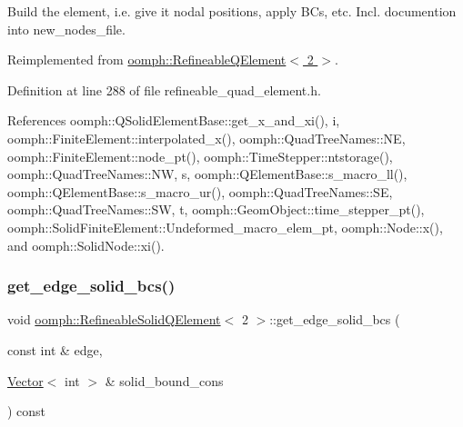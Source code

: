 Build the element, i.\+e. give it nodal positions, apply B\+Cs, etc. Incl. documention into new\+\_\+nodes\+\_\+file. 



Reimplemented from \hyperlink{classoomph_1_1RefineableQElement_3_012_01_4_a8be1a217931d1054ab626ebd1adae182}{oomph\+::\+Refineable\+Q\+Element$<$ 2 $>$}.



Definition at line 288 of file refineable\+\_\+quad\+\_\+element.\+h.



References oomph\+::\+Q\+Solid\+Element\+Base\+::get\+\_\+x\+\_\+and\+\_\+xi(), i, oomph\+::\+Finite\+Element\+::interpolated\+\_\+x(), oomph\+::\+Quad\+Tree\+Names\+::\+NE, oomph\+::\+Finite\+Element\+::node\+\_\+pt(), oomph\+::\+Time\+Stepper\+::ntstorage(), oomph\+::\+Quad\+Tree\+Names\+::\+NW, s, oomph\+::\+Q\+Element\+Base\+::s\+\_\+macro\+\_\+ll(), oomph\+::\+Q\+Element\+Base\+::s\+\_\+macro\+\_\+ur(), oomph\+::\+Quad\+Tree\+Names\+::\+SE, oomph\+::\+Quad\+Tree\+Names\+::\+SW, t, oomph\+::\+Geom\+Object\+::time\+\_\+stepper\+\_\+pt(), oomph\+::\+Solid\+Finite\+Element\+::\+Undeformed\+\_\+macro\+\_\+elem\+\_\+pt, oomph\+::\+Node\+::x(), and oomph\+::\+Solid\+Node\+::xi().

\mbox{\label{classoomph_1_1RefineableSolidQElement_3_012_01_4_af0166873124e0fd52d1a712c7b438891}} 
\subsubsection{\texorpdfstring{get\+\_\+edge\+\_\+solid\+\_\+bcs()}{get\_edge\_solid\_bcs()}}
{\footnotesize\ttfamily void \hyperlink{classoomph_1_1RefineableSolidQElement}{oomph\+::\+Refineable\+Solid\+Q\+Element}$<$ 2 $>$\+::get\+\_\+edge\+\_\+solid\+\_\+bcs (\begin{DoxyParamCaption}\item[{const int \&}]{edge,  }\item[{\hyperlink{classoomph_1_1Vector}{Vector}$<$ int $>$ \&}]{solid\+\_\+bound\+\_\+cons }\end{DoxyParamCaption}) const}



